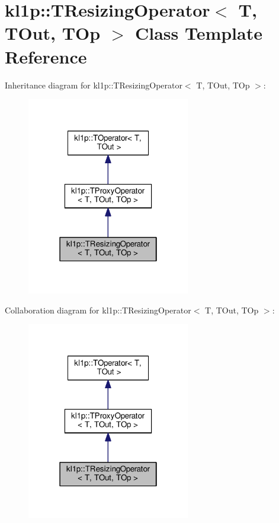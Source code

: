 \hypertarget{classkl1p_1_1TResizingOperator}{}\section{kl1p\+:\+:T\+Resizing\+Operator$<$ T, T\+Out, T\+Op $>$ Class Template Reference}
\label{classkl1p_1_1TResizingOperator}


Inheritance diagram for kl1p\+:\+:T\+Resizing\+Operator$<$ T, T\+Out, T\+Op $>$\+:
\nopagebreak
\begin{figure}[H]
\begin{center}
\leavevmode
\includegraphics[width=202pt]{classkl1p_1_1TResizingOperator__inherit__graph}
\end{center}
\end{figure}


Collaboration diagram for kl1p\+:\+:T\+Resizing\+Operator$<$ T, T\+Out, T\+Op $>$\+:
\nopagebreak
\begin{figure}[H]
\begin{center}
\leavevmode
\includegraphics[width=202pt]{classkl1p_1_1TResizingOperator__coll__graph}
\end{center}
\end{figure}
